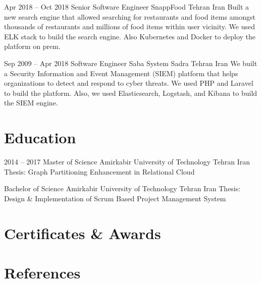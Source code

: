 \documentclass[12pt, a4paper, sans]{moderncv}
\begin{document}
    \cventry
    {Apr 2018 -- Oct 2018}
    {Senior Software Engineer}
    {\newline SnappFood}
    {Tehran}
    {Iran}
    {
        Built a new search engine that allowed searching for restaurants and food items amongst thousands of restaurants and millions of food items within user vicinity.
        We used ELK stack to build the search engine.
        Also Kubernetes and Docker to deploy the platform on prem.
    }

    \cventry
    {Sep 2009 -- Apr 2018}
    {Software Engineer}
    {\newline Saba System Sadra}
    {Tehran}
    {Iran}
    {
        We built a Security Information and Event Management (SIEM) platform that helps organizations to detect and respond to cyber threats.
        We used PHP and Laravel to build the platform.
        Also, we used Elasticsearch, Logstash, and Kibana to build the SIEM engine.
    }


    \section{Education}\label{sec:education}

    \cventry
    {2014 -- 2017}
    {Master of Science}
    {Amirkabir University of Technology}
    {Tehran}
    {Iran}
    {Thesis: Graph Partitioning Enhancement in Relational Cloud}

    {Bachelor of Science}
    {Amirkabir University of Technology}
    {Tehran}
    {Iran}
    {Thesis: Design \& Implementation of Scrum Based Project Management System}


    \section{Certificates \& Awards}\label{sec:certificates-&-awards}


    \section{References}\label{sec:references}

\end{document}
